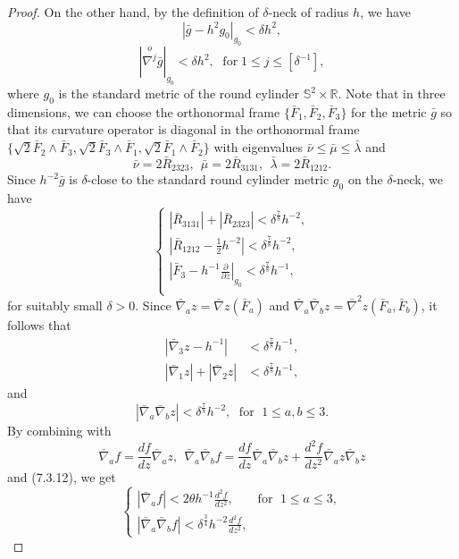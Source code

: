 \begin{proof}
On the other hand, by the definition of $\delta$-neck of radius
$h$, we have
$$
|\bar{g} - h^2g_0|_{g_0} < \delta h^2,
$$
$$
|\overset{o}{\nabla^j}\bar{g}|_{g_0} < \delta h^2, \; \mbox{ for
}\; 1 \leq j\leq [\delta^{-1}],
$$
where $g_0$ is the standard metric of the round cylinder
$\mathbb{S}^2 \times \mathbb{R}$. Note that in three dimensions,
we can choose the orthonormal frame
$\{\bar{F}_1,\bar{F}_2,\bar{F}_3 \}$ for the metric $\bar{g}$ so
that its curvature operator is diagonal in the orthonormal frame
$\{ \sqrt{2}\bar{F}_2\wedge \bar{F}_3, \sqrt{2}\bar{F}_3\wedge
\bar{F}_1, \sqrt{2}\bar{F}_1\wedge \bar{F}_2 \}$ with eigenvalues
$\bar{\nu} \leq \bar{\mu} \leq \bar{\lambda}$ and
$$
\bar{\nu}=2\bar{R}_{2323}, \ \ \bar{\mu}=2\bar{R}_{3131}, \ \
\bar{\lambda}=2\bar{R}_{1212}.
$$
Since $h^{-2}\bar{g}$ is $\delta$-close to the standard round
cylinder metric $g_0$ on the $\delta$-neck, we have \begin{equation} \left\{
\begin{array}{lll}
|\bar{R}_{3131}| + |\bar{R}_{2323}| < \delta^{\frac{7}{8}}h^{-2}, \\[1mm]
|\bar{R}_{1212} - \frac{1}{2}h^{-2}| < \delta^{\frac{7}{8}}h^{-2}, \\[1mm]
|\bar{F}_3 - h^{-1}\frac{\partial}{\partial z}|_{g_0} <
\delta^{\frac{7}{8}}h^{-1},\\[1mm]
\end{array}
\right. %
\end{equation} for suitably small $\delta > 0$. Since $\bar{\nabla}_az =
\bar{\nabla} z(\bar{F}_a)$ and $\bar{\nabla}_a\bar{\nabla}_b z =
\bar{\nabla}^2 z(\bar{F}_a,\bar{F}_b)$, it follows that
\begin{align*}
|\bar{\nabla}_3z - h^{-1}| &< \delta^{\frac{7}{8}}h^{-1},\\
|\bar{\nabla}_1z| + |\bar{\nabla}_2z|
&<\delta^{\frac{7}{8}}h^{-1},
\end{align*}
and
$$
|\bar{\nabla}_a\bar{\nabla}_b z| < \delta^{\frac{7}{8}}h^{-2},\;
\mbox{ for }\; 1 \leq a, b \leq 3.
$$
By combining with
$$
\bar{\nabla}_af = \frac{df}{dz}\bar{\nabla}_az, \ \
\bar{\nabla}_a\bar{\nabla}_bf =
\frac{df}{dz}\bar{\nabla}_a\bar{\nabla}_bz +
\frac{d^2f}{dz^2}\bar{\nabla}_az\bar{\nabla}_bz
$$
and (7.3.12), we get \begin{equation}
\begin{cases}
|\bar{\nabla}_af| < 2\theta h^{-1}\frac{d^2f}{dz^2}, &
\mbox{for }\; 1 \leq a \leq 3, \\[1mm]
   |\bar{\nabla}_a\bar{\nabla}_b f| <
\delta^{\frac{3}{4}}h^{-2}\frac{d^2f}{dz^2},

\end{cases}
\end{equation}
\end{proof}

